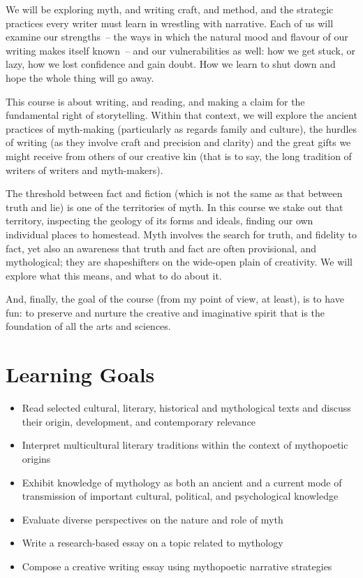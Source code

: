 \documentclass[10pt,DIV09,letterpaper,oneside,headsepline]{scrreprt}
\begin{document}
We will be exploring myth, and writing craft, and method, and the strategic practices every writer must learn in wrestling with narrative. Each of us will examine our strengths~-- the ways in which the natural mood and flavour of our writing makes itself known~-- and our vulnerabilities as well: how we get stuck, or lazy, how we lost confidence and gain doubt. How we learn to shut down and hope the whole thing will go away.

This course is about writing, and reading, and making a claim for the fundamental right of storytelling. Within that context, we will
explore the ancient practices of myth-making (particularly as regards family and culture), the hurdles of writing (as they involve craft and
precision and clarity) and the great gifts we might receive from others of our creative kin (that is to say, the long tradition of writers of writers and myth-makers).

The threshold between fact and fiction (which is not the same as that between truth and lie) is one of the territories of myth. In this course we stake out that territory, inspecting the geology of its forms and ideals, finding our own individual places to homestead. Myth involves the search for truth, and fidelity to fact, yet also an awareness that truth and fact are often provisional, and mythological; they are shapeshifters on the wide-open plain of
creativity. We will explore what this means, and what to do about it.

And, finally, the goal of the course (from my point of view, at least), is to have fun: to preserve and nurture the creative and imaginative spirit that is the foundation of all the arts and sciences.

\section{Learning Goals}
\begin{itemize}

\item Read selected cultural, literary, historical and mythological texts and discuss their origin, development, and contemporary relevance
\item Interpret multicultural literary traditions within the context of mythopoetic origins
\item Exhibit knowledge of mythology as both an ancient and a current mode of transmission of important cultural, political, and psychological knowledge
\item Evaluate diverse perspectives on the nature and role of myth
\item Write a research-based essay on a topic related to mythology
\item Compose a creative writing essay using mythopoetic narrative strategies

\end{itemize}
\end{document}
